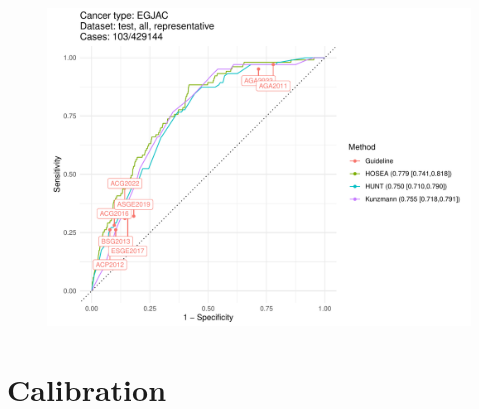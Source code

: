 \documentclass[english]{article}
\begin{document}
\begin{figure}[ht]
\includegraphics[width=1.0\linewidth]{comparison/EGJAC_all_representative.pdf}
\end{figure}




\newpage
\clearpage
\section{Calibration}
\end{document}
